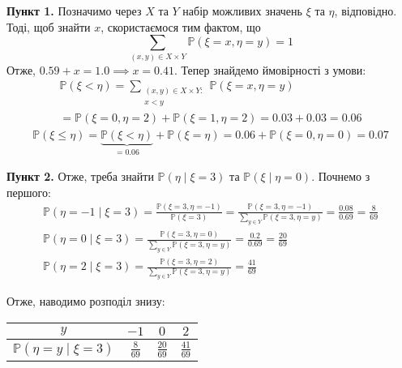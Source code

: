 \documentclass[14pt]{extarticle}
\begin{document}
\textbf{Пункт 1.} Позначимо через $X$ та $Y$ набір можливих значень $\xi$ та $\eta$, відповідно. Тоді, щоб знайти $x$, скористаємося тим фактом, що
\[
\sum_{(x,y) \in X \times Y} \mathbb{P}(\xi=x,\eta=y) = 1
\]
Отже, $0.59+x=1.0 \implies \boxed{x=0.41}$. Тепер знайдемо ймовірності з умови:
\begin{gather*}
\mathbb{P}(\xi < \eta) = \sum_{\substack{(x,y) \in X \times Y: \\ x < y}}\mathbb{P}(\xi=x,\eta=y) \\
= \mathbb{P}(\xi=0,\eta=2) + \mathbb{P}(\xi=1,\eta=2) = 0.03 + 0.03 = \boxed{0.06}
\end{gather*}
\begin{gather*}
    \mathbb{P}(\xi \leq \eta) = \underbrace{\mathbb{P}(\xi < \eta)}_{=0.06}+\mathbb{P}(\xi=\eta) = 0.06 + \mathbb{P}(\xi=0,\eta=0) = \boxed{0.07}
\end{gather*}

\textbf{Пункт 2.} Отже, треба знайти $\mathbb{P}(\eta \mid \xi=3)$ та $\mathbb{P}(\xi \mid \eta=0)$. Почнемо з першого:
\begin{gather*}
\mathbb{P}(\eta=-1 \mid \xi=3) = \frac{\mathbb{P}(\xi=3,\eta=-1)}{\mathbb{P}(\xi=3)} = \frac{\mathbb{P}(\xi=3,\eta=-1)}{\sum_{y \in Y}\mathbb{P}(\xi=3,\eta=y)} = \frac{0.08}{0.69} = \frac{8}{69} \\
\mathbb{P}(\eta=0 \mid \xi=3) = \frac{\mathbb{P}(\xi=3,\eta=0)}{\sum_{y \in Y}\mathbb{P}(\xi=3,\eta=y)} = \frac{0.2}{0.69} = \frac{20}{69} \\
\mathbb{P}(\eta=2 \mid \xi=3) = \frac{\mathbb{P}(\xi=3,\eta=2)}{\sum_{y \in Y}\mathbb{P}(\xi=3,\eta=y)} = \frac{41}{69}
\end{gather*}

Отже, наводимо розподіл знизу:
\begin{center}
\begin{tabular}{ |c|c|c|c| } 
 \hline
 $y$ & $-1$ & $0$ & $2$ \\ 
 \hline
 $\mathbb{P}(\eta=y\mid \xi=3)$ & $\frac{8}{69}$ & $\frac{20}{69}$ & $\frac{41}{69}$ \\ 
 \hline
\end{tabular}
\end{center}
\end{document}
